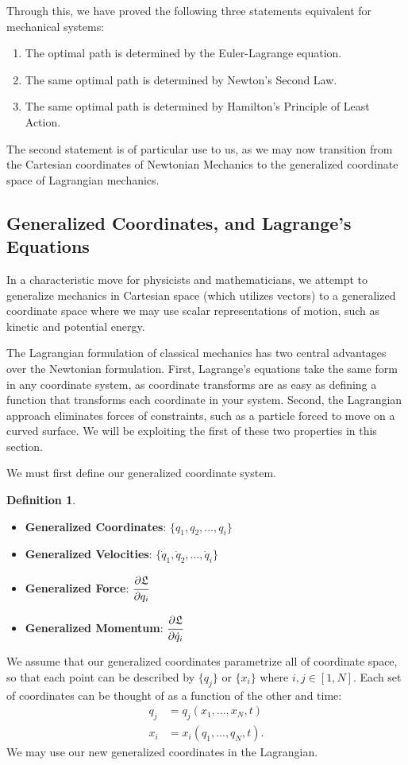 \documentclass[10pt, psamsfonts]{amsart}
\theoremstyle{definition}
\newtheorem{defn}[thm]{Definition}
\theoremstyle{remark}
\numberwithin{equation}{section}
\begin{document}
Through this, we have proved the following three statements equivalent for mechanical systems:
\begin{enumerate}
\item The optimal path is determined by the Euler-Lagrange equation.
\item The same optimal path is determined by Newton's Second Law.
\item The same optimal path is determined by Hamilton's Principle of Least Action.
\end{enumerate}
The second statement is of particular use to us, as we may now transition from the Cartesian coordinates of Newtonian Mechanics to the generalized coordinate space of Lagrangian mechanics.

\subsection{Generalized Coordinates, and Lagrange's Equations}
In a characteristic move for physicists and mathematicians, we attempt to generalize mechanics in Cartesian space (which utilizes vectors) to a generalized coordinate space where we may use scalar representations of motion, such as kinetic and potential energy. 

The Lagrangian formulation of classical mechanics has two central advantages over the Newtonian formulation. First, Lagrange's equations take the same form in any coordinate system, as coordinate transforms are as easy as defining a function that transforms each coordinate in your system. Second, the Lagrangian approach eliminates forces of constraints, such as a particle forced to move on a curved surface. We will be exploiting the first of these two properties in this section.

We must first define our generalized coordinate system.
\begin{defn}
\;
\begin{itemize}
\item[] \textbf{Generalized Coordinates}: $\{q_1, q_2, ..., q_i\}$
\item[] \textbf{Generalized Velocities}: $\{\dot{q}_1, \dot{q}_2, ..., \dot{q}_i\}$
\item[] \textbf{Generalized Force}: $\cfrac{\partial \mathfrak{L}}{\partial q_i} $
\item[] \textbf{Generalized Momentum}: $\cfrac{\partial \mathfrak{L}}{\partial \dot{q}_i}$
\end{itemize}
\end{defn}
\noindent We assume that our generalized coordinates parametrize all of coordinate space, so that each point can be described by $\{q_j\}$ or $\{x_i\}$ where $i, j \in [1, N]$. Each set of coordinates can be thought of as a function of the other and time:
\begin{align*}
  q_j &= q_j(x_1,...,x_N, t)\\
  x_i &= x_i(q_1,...,q_N, t).
\end{align*}
We may use our new generalized coordinates in the Lagrangian.
\end{document}
